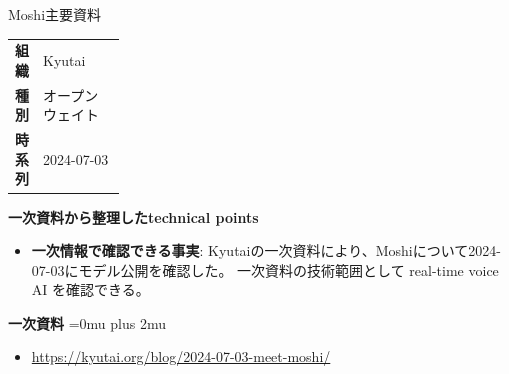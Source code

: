 \begin{technicalnote}{Moshi}{主要資料}
\begingroup
\begin{tabularx}{\linewidth}{@{}>{\bfseries}p{0.22\linewidth}X@{}}
組織 & Kyutai \\
種別 & オープンウェイト \\
時系列 & 2024-07-03 \\
\end{tabularx}
\smallskip
{\bfseries 一次資料から整理したtechnical points}
\begin{itemize}[leftmargin=1.5em,itemsep=0.35em]
\item \textbf{一次情報で確認できる事実}: Kyutaiの一次資料により、Moshiについて2024-07-03にモデル公開を確認した。 一次資料の技術範囲として real-time voice AI を確認できる。
\end{itemize}
\begin{minipage}{\linewidth}
\begin{samepage}
{\bfseries 一次資料}
\begingroup\sloppy
\Urlmuskip=0mu plus 2mu\relax
\begin{itemize}[leftmargin=1.5em,itemsep=0.25em]
\item {\scriptsize\url{https://kyutai.org/blog/2024-07-03-meet-moshi/}}
\end{itemize}
\endgroup
\end{samepage}
\end{minipage}
\endgroup
\end{technicalnote}
\medskip

